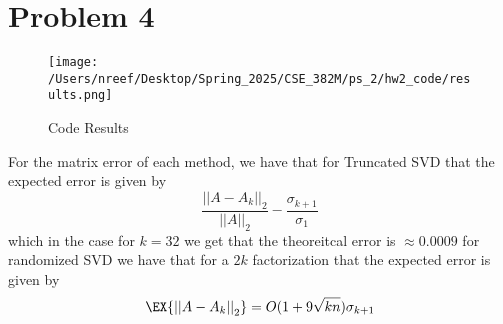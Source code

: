 \documentclass[12pt]{report}
\newcommand{\norm}[1]{\left|\left|#1\right|\right|}
\begin{document}
\section*{Problem 4}


\begin{figure}[H]
  \centering
  \texttt{[image: /Users/nreef/Desktop/Spring\_2025/CSE\_382M/ps\_2/hw2\_code/results.png]}
  \caption{Code Results}
\end{figure}
 
For the matrix error of each method, we have that for Truncated SVD that the expected error is given by
\begin{equation*}
  \frac{\norm{A - A_k}_2}{\norm{A}_2} - \frac{\sigma_{k+1}}{\sigma_1}
\end{equation*}
which in the case for $k = 32$ we get that the theoreitcal error is $\approx 0.0009$ 
for randomized SVD we have that for a $2k$ factorization that the expected error is given by
\begin{equation*}
  \EX{\norm{A - A_k}_2} = O(1 + 9\sqrt{kn}) \sigma_{k+1}
\end{equation*}
\end{document}
